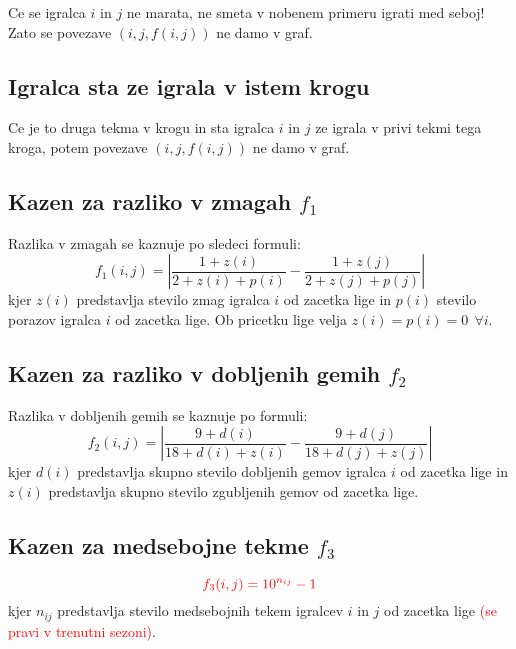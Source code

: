 \documentclass[a4paper, 11pt]{article}
\newcommand{\highlight}[1]{\textcolor{red}{#1}}
\begin{document}
Ce se igralca $i$ in $j$ ne marata, ne smeta v nobenem primeru igrati med seboj! Zato se povezave $\left(i,j,f(i,j)\right)$ ne damo v graf.

\subsection{Igralca sta ze igrala v istem krogu}

Ce je to druga tekma v krogu in sta igralca $i$ in $j$ ze igrala v privi tekmi tega kroga, potem povezave $\left(i,j,f(i,j)\right)$ ne damo v graf.

\subsection{Kazen za razliko v zmagah $f_1$}

Razlika v zmagah se kaznuje po sledeci formuli:
\begin{equation}
	f_1(i,j) = \left|\frac{1 + z(i)}{2 + z(i) + p(i)} - \frac{1 + z(j)}{2 + z(j) + p(j)}\right|
\end{equation}
kjer $z(i)$ predstavlja stevilo zmag igralca $i$ od zacetka lige in $p(i)$ stevilo porazov igralca $i$ od zacetka lige. Ob pricetku lige velja $z(i) = p(i) = 0 \:\: \forall i$.

\subsection{Kazen za razliko v dobljenih gemih $f_2$}

Razlika v dobljenih gemih se kaznuje po formuli:
\begin{equation}
	f_2(i,j) = \left|\frac{9 + d(i)}{18 + d(i) + z(i)} - \frac{9 + d(j)}{18 + d(j) + z(j)}\right|
\end{equation}
kjer $d(i)$ predstavlja skupno stevilo dobljenih gemov igralca $i$ od zacetka lige in $z(i)$ predstavlja skupno stevilo zgubljenih gemov od zacetka lige.

\subsection{Kazen za medsebojne tekme $f_3$}

\begin{equation}
    \highlight{f_3(i,j) = 10^{n_{ij}} - 1}
\end{equation}
kjer $n_{ij}$ predstavlja stevilo medsebojnih tekem igralcev $i$ in $j$ od zacetka lige \highlight{(se pravi v trenutni sezoni)}.
\end{document}
